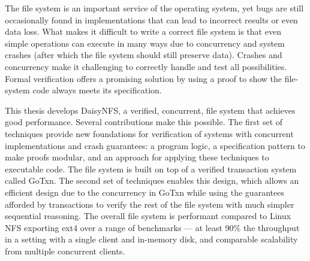 The file system is an important service of the operating system, yet bugs are
still occasionally found in
implementations that can lead to incorrect results
or even data loss. What makes it difficult to write a correct file system is
that even simple operations can execute in many ways due to concurrency and
system crashes (after which the file system should still preserve data). Crashes
and concurrency make it challenging to correctly handle and test all
possibilities. Formal verification offers a promising solution by using a proof
to show the file-system code always meets its specification.

This thesis develops DaisyNFS, a verified, concurrent, file system that achieves
good performance. Several contributions make this possible. The first set of
techniques provide new foundations for verification of systems with concurrent
implementations and crash guarantees: a program logic, a specification pattern
to make proofs modular, and an approach for applying these techniques to
executable code. The file system is built on top of a verified transaction
system called GoTxn. The second set of techniques enables this design, which
allows an efficient design due to the concurrency in GoTxn while using the
guarantees afforded by transactions to verify the rest of the file system with
much simpler sequential reasoning. The overall file system is performant
compared to Linux NFS exporting ext4 over a range of benchmarks --- at least
90\% the throughput in a setting with a single client and in-memory disk, and
comparable scalability from multiple concurrent clients.
